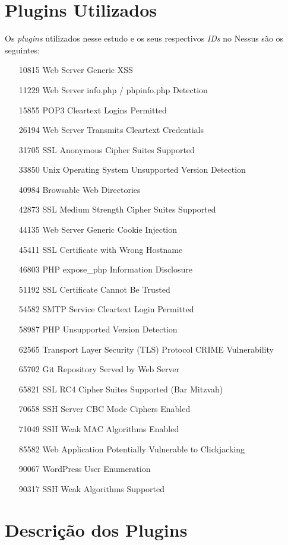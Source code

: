 \documentclass[
	12pt,				%
	openright,			%
	twoside,			%
	a4paper,			%
	english,			%
	french,				%
	spanish,			%
	brazil				%
	]{abntex2}
\begin{document}
\section{Plugins Utilizados}
Os \textit{plugins} utilizados nesse estudo e os seus respectivos \textit{IDs} no Nessus são os seguintes:
\begin{itemize}
	\item [10815]
	Web Server Generic XSS
	\item [11229]
	Web Server info.php / phpinfo.php Detection
	\item [15855]
	POP3 Cleartext Logins Permitted
	\item [26194]
	Web Server Transmits Cleartext Credentials
	\item [31705]
	SSL Anonymous Cipher Suites Supported
	\item [33850]
	Unix Operating System Unsupported Version Detection
	\item [40984]
	Browsable Web Directories
	\item [42873]
	SSL Medium Strength Cipher Suites Supported
	\item [44135]
	Web Server Generic Cookie Injection
	\item [45411]
	SSL Certificate with Wrong Hostname
	\item [46803]
	PHP expose\_php Information Disclosure
	\item [51192]
	SSL Certificate Cannot Be Trusted
	\item [54582]
	SMTP Service Cleartext Login Permitted
	\item [58987]
	PHP Unsupported Version Detection
	\item [62565]
	Transport Layer Security (TLS) Protocol CRIME Vulnerability
	\item [65702]
	Git Repository Served by Web Server
	\item [65821]
	SSL RC4 Cipher Suites Supported (Bar Mitzvah)
	\item [70658]
	SSH Server CBC Mode Ciphers Enabled
	\item [71049]
	SSH Weak MAC Algorithms Enabled
	\item [85582]
	Web Application Potentially Vulnerable to Clickjacking
	\item [90067]
	WordPress User Enumeration
	\item [90317]
	SSH Weak Algorithms Supported
\end{itemize}

\section{Descrição dos Plugins}
\end{document}
